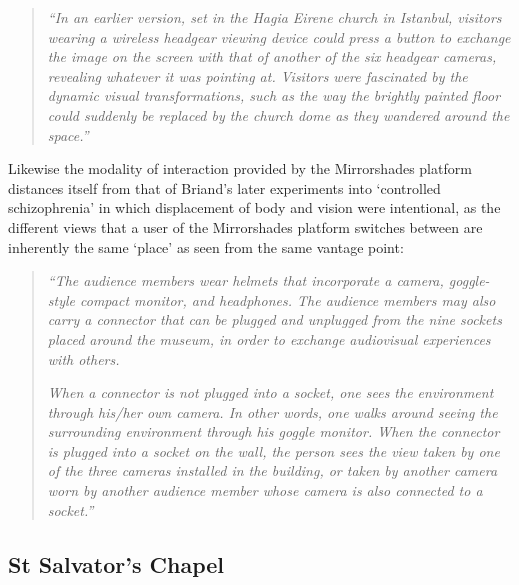 \begin{quote}
	\textit{``In an earlier version, set in the Hagia Eirene church in Istanbul, visitors wearing a wireless headgear viewing device could press a button to exchange the image on the screen with that of another of the six headgear cameras, revealing whatever it was pointing at. Visitors were fascinated by the dynamic visual transformations, such as the way the brightly painted floor could suddenly be replaced by the church dome as they wandered around the space.''}~\cite{Jones2006}
\end{quote}

Likewise the modality of interaction provided by the Mirrorshades platform distances itself from that of Briand's later experiments into `controlled schizophrenia' in which displacement of body and vision were intentional, as the different views that a user of the Mirrorshades platform switches between are inherently the same `place' as seen from the same vantage point:

\begin{quote}
	\textit{``The audience members wear helmets that incorporate a camera, goggle-style compact monitor, and headphones. The audience members may also carry a connector that can be plugged and unplugged from the nine sockets placed around the museum, in order to exchange audiovisual experiences with others.}

	\textit{When a connector is not plugged into a socket, one sees the environment through his/her own camera. In other words, one walks around seeing the surrounding environment through his goggle monitor. When the connector is plugged into a socket on the wall, the person sees the view taken by one of the three cameras installed in the building, or taken by another camera worn by another audience member whose camera is also connected to a socket.''}~\cite{Jones2006}
\end{quote}


\subsection{St Salvator's Chapel}

